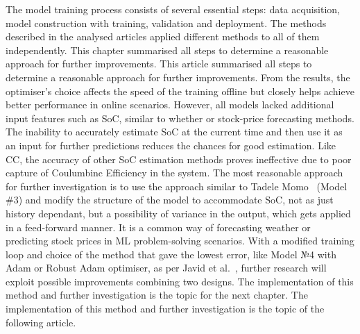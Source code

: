 %
%
The model training process consists of several essential steps: data acquisition, model construction with training, validation and deployment.
The methods described in the analysed articles applied different methods to all of them independently.
 {
    This chapter summarised all steps to determine a reasonable approach for further improvements.
} {
    This article summarised all steps to determine a reasonable approach for further improvements.
}
From the results, the optimiser's choice affects the speed of the training offline but closely helps achieve better performance in online scenarios.
However, all models lacked additional input features such as SoC, similar to whether or stock-price forecasting methods.
The inability to accurately estimate SoC at the current time and then use it as an input for further predictions reduces the chances for good estimation.
Like CC, the accuracy of other SoC estimation methods proves ineffective due to poor capture of Coulumbinc Efficiency in the system.
The most reasonable approach for further investigation is to use the approach similar to Tadele Momo~\cite{mamo_long_2020} (Model \#3) and modify the structure of the model to accommodate SoC, not as just history dependant, but a possibility of variance in the output, which gets applied in a feed-forward manner. 
It is a common way of forecasting weather or predicting stock prices in ML problem-solving scenarios.
With a modified training loop and choice of the method that gave the lowest error, like Model №4 with Adam or Robust Adam optimiser, as per Javid et al.~\cite{javid_adaptive_2020}, further research will exploit possible improvements combining two designs.
 {
    The implementation of this method and further investigation is the topic for the next chapter.
} {
    The implementation of this method and further investigation is the topic of the following article.
}